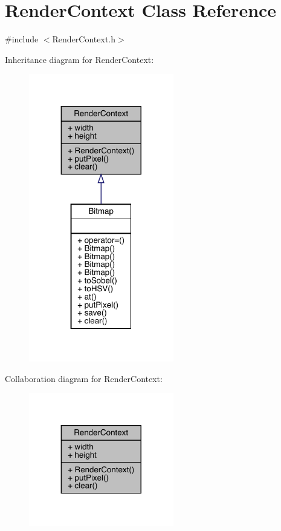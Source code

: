 \hypertarget{class_render_context}{}\section{Render\+Context Class Reference}
\label{class_render_context}


{\ttfamily \#include $<$Render\+Context.\+h$>$}



Inheritance diagram for Render\+Context\+:\nopagebreak
\begin{figure}[H]
\begin{center}
\leavevmode
\includegraphics[width=179pt]{class_render_context__inherit__graph}
\end{center}
\end{figure}


Collaboration diagram for Render\+Context\+:\nopagebreak
\begin{figure}[H]
\begin{center}
\leavevmode
\includegraphics[width=179pt]{class_render_context__coll__graph}
\end{center}
\end{figure}
